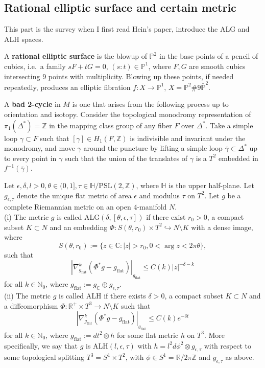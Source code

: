 \begin{survey}
\section{Rational elliptic surface and certain metric}
This part is the survey when I first read Hein's paper\cite{hein2012gravitational}, introduce the ALG and ALH spaces.
\begin{defi}
A \textbf{rational elliptic surface} is the blowup of $\mathbb{P}^2$ in the base points of a pencil of cubics, i.e.\ a family $sF+tG=0$, $(s:t)\in\mathbb{P}^1$, where $F,G$ are smooth cubics intersecting $9$ points with multiplicity. Blowing up these points, if needed repeatedly, produces an elliptic fibration $f\colon X\rightarrow \mathbb{P}^1$, $X=\mathbb{P}^2 \# 9\bar{\mathbb{P}}^2$.
\end{defi}
\begin{defi}
A \textbf{bad 2-cycle} in $M$ is one that arises from the following process up to orientation and isotopy. Consider the topological monodromy representation of $\pi_1(\Delta^*)=\mathbb{Z}$ in the mapping class group of any fiber $F$ over $\Delta^*$. Take a simple loop $\gamma\subset F$ such that $[\gamma]\in H_1(F,\mathbb{Z})$ is indivisible and invariant under the monodromy, and move $\gamma$ around the puncture by lifting a simple loop $\bar{\gamma}\subset \Delta^*$ up to every point in $\gamma$ such that the union of the translates of $\gamma$ is a $T^2$ embedded in $f^{-1}(\bar{\gamma})$.
\end{defi}
\begin{defi}
Let $\epsilon,\delta,l>0,\theta\in (0,1],\tau\in \mathbb{H}/\textrm{PSL}(2,\mathbb{Z})$, where $\mathbb{H}$ is the upper half-plane. Let $g_{\epsilon,\tau}$ denote the unique flat metric of area $\epsilon$ and modulus $\tau$ on $T^2$. Let $g$ be a complete Riemannian metric on an open $4$-manifold $N$.\\ \indent
(i) The metric $g$ is called ALG$(\delta,[\theta,\epsilon,\tau])$ if there exist  $r_0>0$, a compact subset $K\subset N$ and an embedding $\Phi\colon S(\theta,r_0)\times T^2\hookrightarrow N\setminus K$ with a dense image, where
$$S(\theta,r_0):=\{z\in \mathbb{C}: |z|>r_0,0<\arg z<2\pi\theta   \},$$
such that
$$|\nabla^k_{g_{\textrm{flat}}}(\Phi^*g-g_{\textrm{flat}})|_{g_{\textrm{flat}}}\leq C(k)|z|^{-\delta-k}$$
for all $k\in\mathbb{N}_0$, where $g_{\textrm{flat}}:=g_{\mathbb{C}}\oplus  
g_{\epsilon,\tau}$.\\ \indent
(ii) The metric $g$ is called ALH if there exists $\delta>0$, a compact subset $K\subset N$ and a diffeomorphism $\Phi\colon\mathbb{R}^+\times T^3\rightarrow N\setminus K$ such that
$$|\nabla^k_{g_{\textrm{flat}}}(\Phi^*g-g_{\textrm{flat}})|_{g_{\textrm{flat}}}\leq C(k)e^{-\delta t}$$
for all $k\in\mathbb{N}_0$, where $g_{\textrm{flat}}:=dt^2\otimes h$ for some flat metric $h$ on $T^3$. More specifically, we say that $g$ is ALH$(l,\epsilon,\tau)$ with $h=l^2d\phi^2\otimes g_{\epsilon,\tau}$ with respect to some topological splitting $T^3=S^1\times T^2$, with $\phi\in S^1=\mathbb{R}/2\pi \mathbb{Z}$ and $g_{\epsilon,\tau}$ as above.
\end{defi}






\end{survey}
